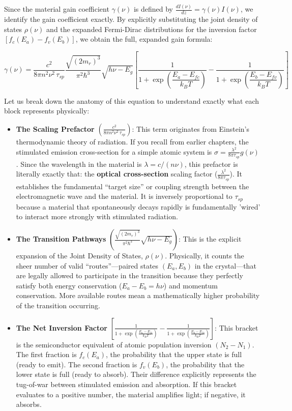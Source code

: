 Since the material gain coefficient $\gamma(\nu)$ is defined by $\frac{dI(\nu)}{dz} = \gamma(\nu) I(\nu)$, we identify the gain coefficient exactly. By explicitly substituting the joint density of states $\rho(\nu)$ and the expanded Fermi-Dirac distributions for the inversion factor $[f_c(E_a) - f_v(E_b)]$, we obtain the full, expanded gain formula:
\begin{keyresult}
    \begin{equation}
        \gamma(\nu) = \frac{c^2}{8\pi n^2\nu^2\,\tau_{sp}} \frac{\sqrt{(2m_r)^3}}{\pi^2\hbar^3}\sqrt{h\nu - E_g} \left[ \frac{1}{1+\exp\!\left(\dfrac{E_a - E_{fc}}{k_BT}\right)} - \frac{1}{1+\exp\!\left(\dfrac{E_b - E_{fv}}{k_BT}\right)} \right]
    \end{equation}
\end{keyresult}
Let us break down the anatomy of this equation to understand exactly what each block represents physically:
\begin{itemize}
    \item \textbf{The Scaling Prefactor} $\left( \frac{c^2}{8\pi n^2\nu^2\,\tau_{sp}} \right)$: This term originates from Einstein's thermodynamic theory of radiation. If you recall from earlier chapters, the stimulated emission cross-section for a simple atomic system is $\sigma = \frac{\lambda^2}{8\pi \tau_{sp}} g(\nu)$. Since the wavelength in the material is $\lambda = c / (n\nu)$, this prefactor is literally exactly that: the \textbf{optical cross-section} scaling factor ($\frac{\lambda^2}{8\pi\tau_{sp}}$). It establishes the fundamental ``target size'' or coupling strength between the electromagnetic wave and the material. It is inversely proportional to $\tau_{sp}$ because a material that spontaneously decays rapidly is fundamentally 'wired' to interact more strongly with stimulated radiation.
    \item \textbf{The Transition Pathways} $\left( \frac{\sqrt{(2m_r)^3}}{\pi^2\hbar^3}\sqrt{h\nu - E_g} \right)$: This is the explicit expansion of the Joint Density of States, $\rho(\nu)$. Physically, it counts the sheer number of valid ``routes''—paired states $(E_a, E_b)$ in the crystal—that are legally allowed to participate in the transition because they perfectly satisfy both energy conservation ($E_a - E_b = h\nu$) and momentum conservation. More available routes mean a mathematically higher probability of the transition occurring.
    \item \textbf{The Net Inversion Factor} $\left[ \frac{1}{1+\exp\!\left(\frac{E_a - E_{fc}}{k_BT}\right)} - \frac{1}{1+\exp\!\left(\frac{E_b - E_{fv}}{k_BT}\right)} \right]$: This bracket is the semiconductor equivalent of atomic population inversion $(N_2 - N_1)$. The first fraction is $f_c(E_a)$, the probability that the upper state is full (ready to emit). The second fraction is $f_v(E_b)$, the probability that the lower state is full (ready to absorb). Their difference explicitly represents the tug-of-war between stimulated emission and absorption. If this bracket evaluates to a positive number, the material amplifies light; if negative, it absorbs.
\end{itemize}

